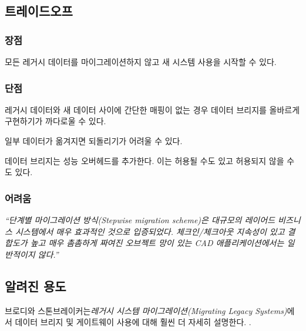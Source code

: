 \documentclass[a4paper,10pt,twoside]{book}
\begin{document}
\subsection*{트레이드오프}

\subsubsection*{장점}

\begin{bulletlist}
\item 모든 레거시 데이터를 마이그레이션하지 않고 새 시스템 사용을 시작할 수 있다.
\end{bulletlist}

\subsubsection*{단점}

\begin{bulletlist}
\item 레거시 데이터와 새 데이터 사이에 간단한 매핑이 없는 경우 데이터 브리지를 올바르게 구현하기가 까다로울 수 있다.

\item 일부 데이터가 옮겨지면 되돌리기가 어려울 수 있다.

\item 데이터 브리지는 성능 오버헤드를 추가한다. 이는 허용될 수도 있고 허용되지 않을 수도 있다.
\end{bulletlist}

\subsubsection*{어려움}

\begin{bulletlist}
\item \emph{``단계별 마이그레이션 방식(Stepwise migration scheme)은 대규모의 레이어드 비즈니스 시스템에서 매우 효과적인 것으로 입증되었다. 체크인/체크아웃 지속성이 있고 결합도가 높고 매우 촘촘하게 짜여진 오브젝트 망이 있는 CAD 애플리케이션에서는 일반적이지 않다.''} \cite{Kell00a}
\end{bulletlist}

\subsection*{알려진 용도}

브로디와 스톤브레이커는\emph{레거시 시스템 마이그레이션(Migrating Legacy Systems)}에서 데이터 브리지 및 게이트웨이 사용에 대해 훨씬 더 자세히 설명한다. \cite{Brod95a}. 
\end{document}
